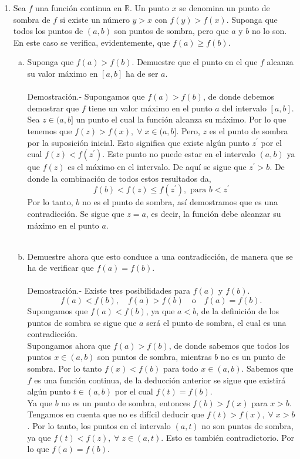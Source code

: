 \begin{enumerate}[\bfseries 1.]
\begin{enumerate}[(a)]
	\end{enumerate}

    \item Sea $f$ una función continua en $\mathbb{R}$. Un punto $x$ se denomina un punto de sombra de $f$ si existe un número $y>x$ con $f(y)>f(x)$. Suponga que todos los puntos de $(a,b)$ son puntos de sombra, pero que $a$ y $b$ no lo son. En este caso se verifica, evidentemente, que $f(a)\geq f(b).$

	\begin{enumerate}[(a)]

	    \item Suponga que $f(a)>f(b)$. Demuestre que el punto en el que $f$ alcanza su valor máximo en $[a,b]$ ha de ser $a$.\\\\
		Demostración.-\; Supongamos que $f(a)>f(b)$, de donde debemos demostrar que $f$ tiene un valor máximo en el punto $a$ del intervalo $[a,b]$. Sea $z\in (a,b]$ un punto el cual la función alcanza su máximo. Por lo que tenemos que $f(z)>f(x),\; \forall \; x\in (a,b]$. Pero, $z$ es el punto de sombra por la suposición inicial. Esto significa que existe algún punto $z^{'}$ por el cual $f(z)<f(z^{'})$. Este punto no puede estar en el intervalo $(a,b)$ ya que $f(z)$ es el máximo en el intervalo. De aquí se sigue que $z^{'}>b$. De donde la combinación de todos estos resultados da,
		$$f(b)<f(z)\leq f(z^{'}), \mbox{ para } b<z^{'}$$
		Por lo tanto, $b$ no es el punto de sombra, así demostramos que es una contradicción. Se sigue que $z=a$, es decir, la función debe alcanzar su máximo en el punto $a$.\\\\

	    \item Demuestre ahora que esto conduce a una contradicción, de manera que se ha de verificar que $f(a)=f(b).$\\\\
		Demostración.-\; Existe tres posibilidades para $f(a)$ y $f(b)$. 
		$$f(a)<f(b),\quad f(a)>f(b) \quad \mbox{o} \quad f(a)=f(b).$$
		Supongamos que $f(a)<f(b)$, ya que $a<b$, de la definición de los puntos de sombra se sigue que $a$ será el punto de sombra, el cual es una contradicción.\\
		Supongamos ahora que $f(a)>f(b)$, de donde sabemos que todos los puntos $x\in (a,b)$ son puntos de sombra, mientras $b$  no es un punto de sombra. Por lo tanto $f(x)<f(b)$ para todo $x\in (a,b)$. Sabemos que $f$ es una función continua, de la deducción anterior se sigue que existirá algún punto $t\in (a,b)$ por el cual $f(t)=f(b).$\\
		Ya que $b$ no es un punto de sombra, entonces $f(b)>f(x)$ para $x>b$. Tengamos en cuenta que no es difícil deducir que $f(t)>f(x),\; \forall\; x > b$. Por lo tanto, los puntos en el intervalo $(a,t)$ no son puntos de sombra, ya que $f(t)<f(z),\; \forall\; z \in (a,t)$. Esto es también contradictorio. Por lo que $f(a)=f(b)$.\\\\


\end{enumerate}
\end{enumerate}
